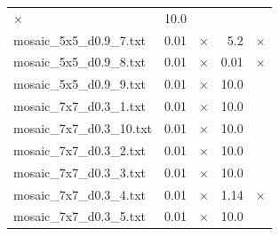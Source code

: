 \documentclass{article}
\begin{document}
\begin{center}
\begin{tabular}{lrrrr}
$\times$
 & 10.0 & 
\\
mosaic\_5x5\_d0.9\_7.txt & 0.01 & 
$\times$
 & 5.2 & 
$\times$
\\
mosaic\_5x5\_d0.9\_8.txt & 0.01 & 
$\times$
 & 0.01 & 
$\times$
\\
mosaic\_5x5\_d0.9\_9.txt & 0.01 & 
$\times$
 & 10.0 & 
\\
mosaic\_7x7\_d0.3\_1.txt & 0.01 & 
$\times$
 & 10.0 & 
\\
mosaic\_7x7\_d0.3\_10.txt & 0.01 & 
$\times$
 & 10.0 & 
\\
mosaic\_7x7\_d0.3\_2.txt & 0.01 & 
$\times$
 & 10.0 & 
\\
mosaic\_7x7\_d0.3\_3.txt & 0.01 & 
$\times$
 & 10.0 & 
\\
mosaic\_7x7\_d0.3\_4.txt & 0.01 & 
$\times$
 & 1.14 & 
$\times$
\\
mosaic\_7x7\_d0.3\_5.txt & 0.01 & 
$\times$
 & 10.0 & 
\\
\hline\end{tabular}
\end{center}
\end{document}
